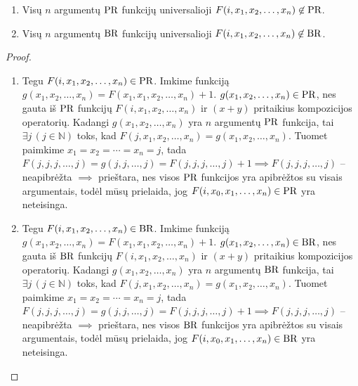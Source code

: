 \begin{prop}
  \begin{enumerate}
    \item Visų $n$ argumentų $\mathop{\text{PR}}$ funkcijų universalioji
      $F(i,x_1,x_2,\dotsc,x_n) \not \in \mathop{\text{PR}}$.
    \item Visų $n$ argumentų $\mathop{\text{BR}}$ funkcijų universalioji
      $F(i,x_1,x_2,\dotsc,x_n) \not \in \mathop{\text{BR}}$.
  \end{enumerate}
  \begin{proof}
    \begin{enumerate}
      \item Tegu $F(i,x_1,x_2,\dotsc,x_n) \in \mathop{\text{PR}}$.
        Imkime funkciją 
        $g(x_1,x_2,\dotsc,x_n) = F(x_1,x_1,x_2,\dotsc,x_n)+1$.
        $g(x_1,x_2,\dotsc,x_n) \in \mathop{\text{PR}}$, nes gauta iš $\mathop{\text{PR}}$ funkcijų
        $F(i,x_1,x_2,\dotsc,x_n)$ ir $(x+y)$ pritaikius kompozicijos
        operatorių. Kadangi $g(x_1,x_2,\dotsc,x_n)$ yra $n$ argumentų
        $\mathop{\text{PR}}$ funkcija, tai $\exists j\, (j \in \mathbb{N})$ toks, kad
        $F(j,x_1,x_2,\dotsc,x_n) = g(x_1,x_2,\dotsc,x_n)$. Tuomet
        paimkime $x_1 = x_2 = \cdots = x_n = j$, tada 
        $F(j, j, j, \dotsc, j) = g(j, j, \dotsc, j) =%
        F(j, j, j, \dotsc, j) + 1 \implies F(j, j, j, \dotsc, j)$ – 
        neapibrėžta $\implies$ prieštara, nes visos $\mathop{\text{PR}}$ funkcijos
        yra apibrėžtos su visais argumentais, todėl mūsų prielaida, jog
        $F(i,x_0,x_1,\dotsc,x_n) \in \mathop{\text{PR}}$ yra neteisinga.

      \item Tegu $F(i,x_1,x_2,\dotsc,x_n) \in \mathop{\text{BR}}$.
        Imkime funkciją 
        $g(x_1,x_2,\dotsc,x_n) = F(x_1,x_1,x_2,\dotsc,x_n)+1$.
        $g(x_1,x_2,\dotsc,x_n) \in \mathop{\text{BR}}$, nes gauta iš $\mathop{\text{BR}}$ funkcijų
        $F(i,x_1,x_2,\dotsc,x_n)$ ir $(x+y)$ pritaikius kompozicijos
        operatorių. Kadangi $g(x_1,x_2,\dotsc,x_n)$ yra $n$ argumentų
        $\mathop{\text{BR}}$ funkcija, tai $\exists j\, (j \in \mathbb{N})$ toks, kad
        $F(j,x_1,x_2,\dotsc,x_n) = g(x_1,x_2,\dotsc,x_n)$. Tuomet
        paimkime $x_1 = x_2 = \cdots = x_n = j$, tada 
        $F(j, j, j, \dotsc, j) = g(j, j, \dotsc, j) =%
        F(j, j, j, \dotsc, j) + 1 \implies F(j, j, j, \dotsc, j)$ – 
        neapibrėžta $\implies$ prieštara, nes visos $\mathop{\text{BR}}$ funkcijos
        yra apibrėžtos su visais argumentais, todėl mūsų prielaida, jog
        $F(i,x_0,x_1,\dotsc,x_n) \in \mathop{\text{BR}}$ yra neteisinga.
    \end{enumerate}
  \end{proof}
\end{prop}

